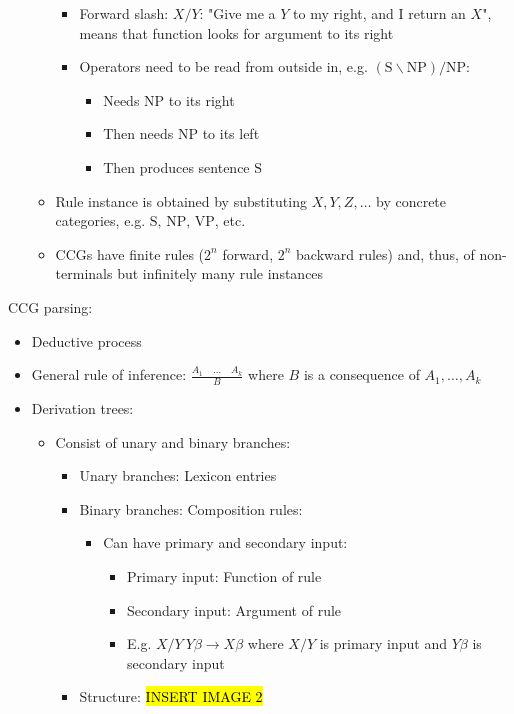 \begin{itemize}
\begin{itemize}
\begin{itemize}
            \item Forward slash: $X / Y$: "Give me a $Y$ to my right, and I return an $X$", means that function looks for argument to its right
            \item Operators need to be read from outside in, e.g. $(\textrm{S} \backslash \textrm{NP}) / \textrm{NP}$:
            \begin{itemize}
                \item Needs $\textrm{NP}$ to its right
                \item Then needs $\textrm{NP}$ to its left
                \item Then produces sentence $\textrm{S}$
            \end{itemize}
        \end{itemize}
        \item Rule instance is obtained by substituting $X, Y, Z, \dots$ by concrete categories, e.g. $\textrm{S, NP, VP}$, etc.
        \item CCGs have finite rules ($2^n$ forward, $2^n$ backward rules) and, thus, of non-terminals but infinitely many rule instances
    \end{itemize}
\end{itemize}
CCG parsing:
\begin{itemize}
    \item Deductive process
    \item General rule of inference:
    $
    \frac{A_1 \quad \dots \quad A_k}{B}
    $
    where $B$ is a consequence of $A_1, \dots, A_k$
    \item Derivation trees:
    \begin{itemize}
        \item Consist of unary and binary branches:
        \begin{itemize}
            \item Unary branches: Lexicon entries
            \item Binary branches: Composition rules:
            \begin{itemize}
                \item Can have primary and secondary input:
                \begin{itemize}
                    \item Primary input: Function of rule
                    \item Secondary input: Argument of rule
                    \item E.g. $X/Y \ Y\beta \to X\beta$ where $X/Y$ is primary input and $Y\beta$ is secondary input
                \end{itemize}
            \end{itemize}
            \item Structure:
            \hl{INSERT IMAGE 2}
        \end{itemize}
    \end{itemize}
\end{itemize}
